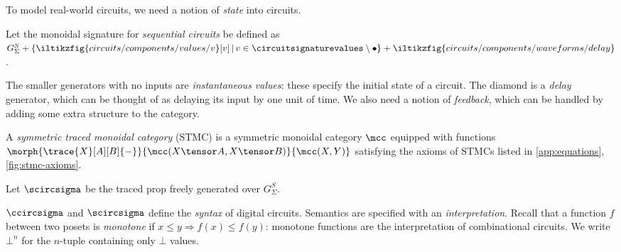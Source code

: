 To model real-world circuits, we need a notion of \emph{state} into circuits.

\begin{definition}
    Let the monoidal signature for \emph{sequential circuits} be defined as \(
    G^S_\Sigma
    +
    \{
        \iltikzfig{circuits/components/values/v}[v]
        \, | \,
        v \in \circuitsignaturevalues \setminus \bullet
    \}
    +
    \iltikzfig{circuits/components/waveforms/delay}
\).
\end{definition}

The smaller generators with no inputs are \emph{instantaneous values}: these
specify the initial state of a circuit.
The diamond is a \emph{delay} generator, which can be thought of as delaying its
input by one unit of time.
We also need a notion of \emph{feedback}, which can be handled by adding some
extra structure to the category.

\begin{definition}
    A \emph{symmetric traced monoidal category} (STMC) is a
    symmetric monoidal category \(\mcc\) equipped with functions
    \(
        \morph{
            \trace{X}[A][B]{-}
        }{
            \mcc(X \tensor A, X \tensor B)
        }{
            \mcc(X, Y)
        }
    \) satisfying the axioms of STMCs listed in \cref{app:equations},
    \cref{fig:stmc-axioms}.
\end{definition}

\begin{definition}
    Let \(\scircsigma\) be the traced prop freely generated over \(G^S_\Sigma\).
\end{definition}

\(\ccircsigma\) and \(\scircsigma\) define the \emph{syntax} of digital
circuits.
Semantics are specified with an \emph{interpretation}.
Recall that a function \(f\) between two posets is \emph{monotone}
if \(x \leq y \Rightarrow f(x) \leq f(y)\): monotone functions are the
interpretation of combinational circuits.
We write \(\bot^n\) for the \(n\)-tuple containing only \(\bot\) values.

